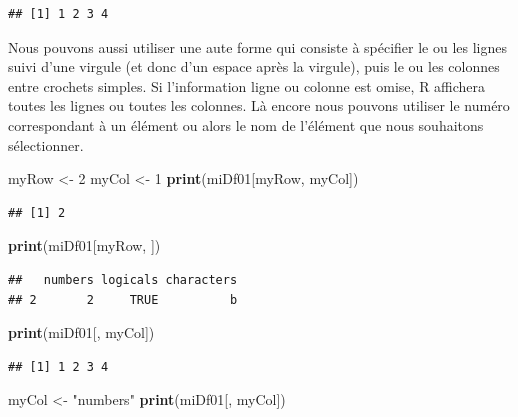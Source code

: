 \documentclass[]{book}
\newenvironment{Shaded}{\begin{snugshade}}{\end{snugshade}}
\newcommand{\KeywordTok}[1]{\textcolor[rgb]{0.13,0.29,0.53}{\textbf{#1}}}
\newcommand{\DecValTok}[1]{\textcolor[rgb]{0.00,0.00,0.81}{#1}}
\newcommand{\StringTok}[1]{\textcolor[rgb]{0.31,0.60,0.02}{#1}}
\newcommand{\NormalTok}[1]{#1}
\begin{document}
\begin{verbatim}
## [1] 1 2 3 4
\end{verbatim}

Nous pouvons aussi utiliser une aute forme qui consiste à spécifier le
ou les lignes suivi d'une virgule (et donc d'un espace après la
virgule), puis le ou les colonnes entre crochets simples. Si
l'information ligne ou colonne est omise, R affichera toutes les lignes
ou toutes les colonnes. Là encore nous pouvons utiliser le numéro
correspondant à un élément ou alors le nom de l'élément que nous
souhaitons sélectionner.

\begin{Shaded}
\begin{Highlighting}[]
\NormalTok{myRow <-}\StringTok{ }\DecValTok{2}
\NormalTok{myCol <-}\StringTok{ }\DecValTok{1}
\KeywordTok{print}\NormalTok{(miDf01[myRow, myCol])}
\end{Highlighting}
\end{Shaded}

\begin{verbatim}
## [1] 2
\end{verbatim}

\begin{Shaded}
\begin{Highlighting}[]
\KeywordTok{print}\NormalTok{(miDf01[myRow, ])}
\end{Highlighting}
\end{Shaded}

\begin{verbatim}
##   numbers logicals characters
## 2       2     TRUE          b
\end{verbatim}

\begin{Shaded}
\begin{Highlighting}[]
\KeywordTok{print}\NormalTok{(miDf01[, myCol])}
\end{Highlighting}
\end{Shaded}

\begin{verbatim}
## [1] 1 2 3 4
\end{verbatim}

\begin{Shaded}
\begin{Highlighting}[]
\NormalTok{myCol <-}\StringTok{ "numbers"}
\KeywordTok{print}\NormalTok{(miDf01[, myCol])}
\end{Highlighting}
\end{Shaded}
\end{document}
